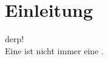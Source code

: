 
\section{Einleitung} \label{sec:einleitung}

derp!\cite{dewailly_2015} \\

Eine  ist nicht immer eine .
